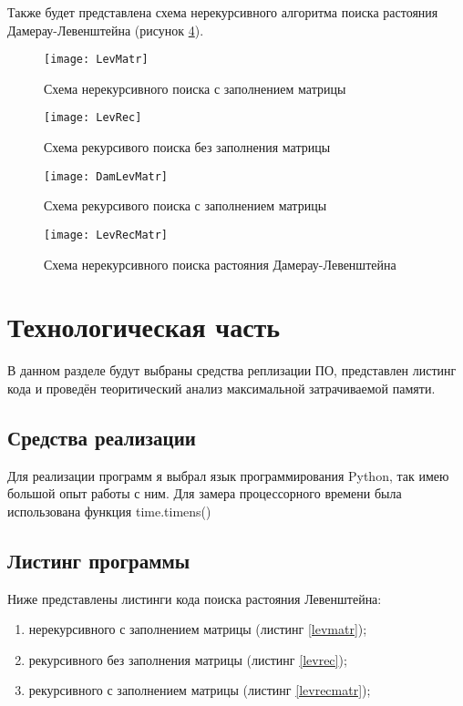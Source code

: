 \documentclass[utf8x, 12pt]{G7-32}
\begin{document}
        Также будет представлена схема нерекурсивного алгоритма поиска растояния Дамерау-Левенштейна (рисунок \ref{schema:matr:Dameray-Levenstein}).

    \begin{figure}[h!]
        \centering
        \texttt{[image: LevMatr]}
        \caption{Схема нерекурсивного поиска с заполнением матрицы}
        \label{schema:matr:Levenstein}
    \end{figure}

    \begin{figure}[h!]
        \centering
        \texttt{[image: LevRec]}
        \caption{Схема рекурсивого поиска без заполнения матрицы}
        \label{schema:rec:Levenstein}
    \end{figure}

    \begin{figure}[h!]
        \centering
        \texttt{[image: DamLevMatr]}
        \caption{Схема рекурсивого поиска с заполнением матрицы}
        \label{schema:rec-matr:Levenstein}
    \end{figure}

    \begin{figure}[h!]
        \centering
        \texttt{[image: LevRecMatr]}
        \caption{Схема нерекурсивного поиска растояния Дамерау-Левенштейна}
        \label{schema:matr:Dameray-Levenstein}
    \end{figure}

\chapter{Технологическая часть}
В данном разделе будут выбраны средства реплизации ПО, представлен листинг кода
и проведён теоритический анализ максимальной затрачиваемой памяти.
\section{Средства реализации}
Для реализации программ я выбрал язык программирования Python, так имею большой опыт работы с ним.
Для замера процессорного времени была использована функция time.timens() \cite{link_time} 

    \section{Листинг программы}
        Ниже представлены листинги кода поиска растояния Левенштейна: \begin{enumerate}
            \item нерекурсивного с заполнением матрицы (листинг \ref{levmatr});
            \item рекурсивного без заполнения матрицы (листинг \ref{levrec});
            \item рекурсивного с заполнением матрицы (листинг \ref{levrecmatr});
        \end{enumerate}
        
\end{document}
